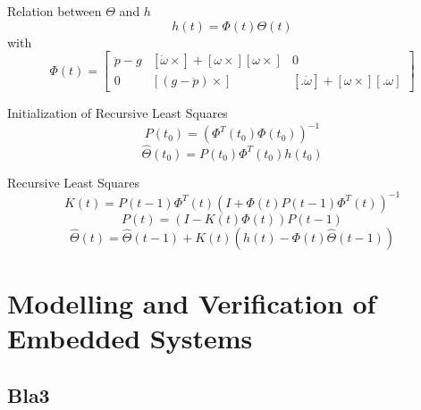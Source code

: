 Relation between $\Theta$ and $h$
\begin{equation}
	h(t) = \Phi(t) \Theta(t)
\end{equation}
with
\begin{equation}
	\Phi(t) = 
	\begin{bmatrix}
		\ddot p - g	& [\dot \omega \times] + [\omega \times] [\omega \times]	& 0 \\
		0			& [(g - \ddot p) \times]									& [. \dot \omega] + [\omega \times] [. \omega]
	\end{bmatrix}
\end{equation}

Initialization of Recursive Least Squares
\begin{equation}
	P(t_0) = \left( \Phi^T(t_0) \Phi(t_0) \right)^{-1}
\end{equation}
\begin{equation}
	\hat \Theta (t_0) = P(t_0) \Phi^T(t_0) h(t_0)
\end{equation}

Recursive Least Squares
\begin{equation}
	K(t) = P(t-1) \Phi^T(t) (I + \Phi(t) P(t - 1) \Phi^T(t))^{-1}
\end{equation}
\begin{equation}
	P(t) = (I - K(t) \Phi(t)) P(t - 1)
\end{equation}
\begin{equation}
	\hat \Theta(t) = \hat \Theta(t - 1) + K(t) (h(t) - \Phi(t) \hat \Theta(t - 1))
\end{equation}

\chapter{Modelling and Verification of Embedded Systems}

\section{Bla3}
\label{sec:bla3}
\lipsum[1] 
